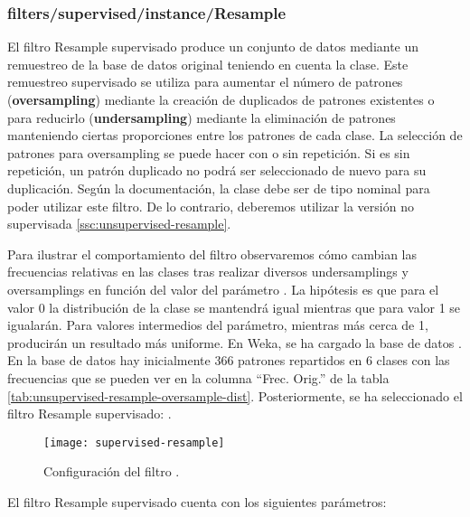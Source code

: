 \subsubsection{filters/supervised/instance/Resample}
\label{ssc:supervised-resample}
El filtro Resample supervisado produce un conjunto de datos mediante un remuestreo de la base de datos original teniendo en cuenta la clase. Este remuestreo supervisado se utiliza para aumentar el número de patrones (\textbf{oversampling}) mediante la creación de duplicados de patrones existentes o para reducirlo (\textbf{undersampling}) mediante la eliminación de patrones manteniendo ciertas proporciones entre los patrones de cada clase. La selección de patrones para oversampling se puede hacer con o sin repetición. Si es sin repetición, un patrón duplicado no podrá ser seleccionado de nuevo para su duplicación. Según la documentación, la clase debe ser de tipo nominal para poder utilizar este filtro. De lo contrario, deberemos utilizar la versión no supervisada \ref{ssc:unsupervised-resample}.

Para ilustrar el comportamiento del filtro observaremos cómo cambian las frecuencias relativas en las clases tras realizar diversos undersamplings y oversamplings en función del valor del parámetro . La hipótesis es que para el valor 0 la distribución de la clase se mantendrá igual mientras que para valor 1 se igualarán. Para valores intermedios del parámetro, mientras más cerca de 1, producirán un resultado más uniforme. En Weka, se ha cargado la base de datos . En la base de datos hay inicialmente 366 patrones repartidos en 6 clases con las frecuencias que se pueden ver en la columna ``Frec. Orig.'' de la tabla \ref{tab:unsupervised-resample-oversample-dist}. Posteriormente, se ha seleccionado el filtro Resample supervisado: .

\begin{figure}[ht]
    \centering
    \texttt{[image: supervised-resample]}
    \caption{Configuración del filtro .}
    \label{fig:supervised-resample}
\end{figure}
El filtro Resample supervisado cuenta con los siguientes parámetros:


